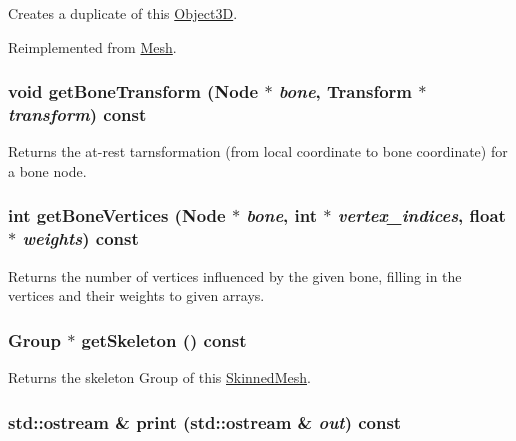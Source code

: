 Creates a duplicate of this \hyperlink{classm3g_1_1Object3D}{Object3D}. 

Reimplemented from \hyperlink{classm3g_1_1Mesh_52ce6d0b3eda2bd3a95bfb5b7dbb6f82}{Mesh}.\hypertarget{classm3g_1_1SkinnedMesh_e6c2fed8109053ded845e49f5c3b0c73}{
\subsubsection[{getBoneTransform}]{\setlength{\rightskip}{0pt plus 5cm}void getBoneTransform ({\bf Node} $\ast$ {\em bone}, \/  {\bf Transform} $\ast$ {\em transform}) const}}
\label{classm3g_1_1SkinnedMesh_e6c2fed8109053ded845e49f5c3b0c73}


Returns the at-rest tarnsformation (from local coordinate to bone coordinate) for a bone node. \hypertarget{classm3g_1_1SkinnedMesh_84ec0935b92b7ccc0aed7e66c4eac78f}{
\subsubsection[{getBoneVertices}]{\setlength{\rightskip}{0pt plus 5cm}int getBoneVertices ({\bf Node} $\ast$ {\em bone}, \/  int $\ast$ {\em vertex\_\-indices}, \/  float $\ast$ {\em weights}) const}}
\label{classm3g_1_1SkinnedMesh_84ec0935b92b7ccc0aed7e66c4eac78f}


Returns the number of vertices influenced by the given bone, filling in the vertices and their weights to given arrays. \hypertarget{classm3g_1_1SkinnedMesh_ce7d69c2b600f6f01a46214db28e6f92}{
\subsubsection[{getSkeleton}]{\setlength{\rightskip}{0pt plus 5cm}Group $\ast$ getSkeleton () const}}
\label{classm3g_1_1SkinnedMesh_ce7d69c2b600f6f01a46214db28e6f92}


Returns the skeleton Group of this \hyperlink{classm3g_1_1SkinnedMesh}{SkinnedMesh}. \hypertarget{classm3g_1_1SkinnedMesh_6fea17fa1532df3794f8cb39cb4f911f}{
\subsubsection[{print}]{\setlength{\rightskip}{0pt plus 5cm}std::ostream \& print (std::ostream \& {\em out}) const}}
\label{classm3g_1_1SkinnedMesh_6fea17fa1532df3794f8cb39cb4f911f}


